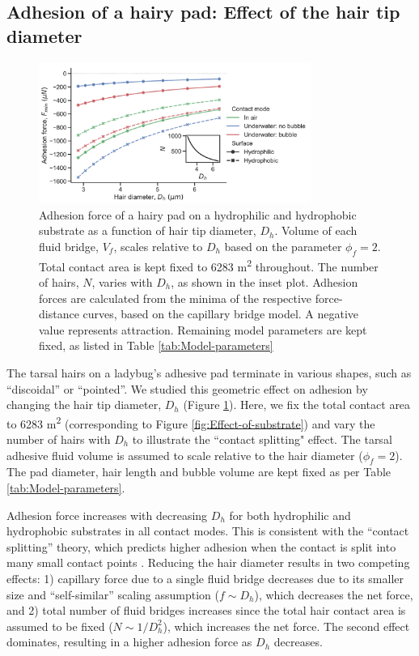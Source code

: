 \documentclass[vruler,JEB]{COB}%
\begin{document}
\subsection{Adhesion of a hairy pad: Effect of the hair tip diameter}

\begin{figure}
\includegraphics[width=3.5in]{Figure6-Model_effect_of_hair_size}
\caption{\label{fig:Effect-of-hair}Adhesion force of a hairy pad on a hydrophilic and hydrophobic substrate as a function of
hair tip diameter, $D_{h}$. Volume of each fluid bridge, $V_{f}$, scales
relative to $D_{h}$ based on the parameter $\phi_{f}=2$. Total contact area is kept fixed to 6283 \textmu m\textsuperscript{2} throughout.  The number of hairs, $N$, varies with $D_h$, as shown in the inset plot.  Adhesion
forces are calculated from the minima of the respective force-distance
curves, based on the capillary bridge model. A negative value represents
attraction. Remaining model parameters are kept fixed, as listed in Table \ref{tab:Model-parameters}}
\end{figure}

The tarsal hairs on a ladybug's adhesive pad terminate in various shapes, such as ``discoidal''
or ``pointed''. We studied this geometric effect on adhesion by
changing the hair tip diameter, $D_{h}$ (Figure \ref{fig:Effect-of-hair}).
Here, we fix the total contact area to 6283 \textmu m\textsuperscript{2} (corresponding to Figure \ref{fig:Effect-of-substrate}) and vary the number of hairs with $D_h$ to illustrate the ``contact splitting" effect. The tarsal adhesive fluid volume is assumed to scale relative
to the hair diameter ($\phi_{f}=2$). The pad diameter, hair length and bubble volume
are kept fixed as per Table \ref{tab:Model-parameters}.

Adhesion force increases with decreasing $D_{h}$ for both hydrophilic
and hydrophobic substrates in all contact modes. This is consistent
with the ``contact splitting'' theory, which predicts higher adhesion
when the contact is split into many small contact points \citep{RN24}.
Reducing the hair diameter results in two competing effects: 1) capillary
force due to a single fluid bridge decreases due to its smaller size
and ``self-similar'' scaling assumption ($f\sim D_{h}$), which
decreases the net force, and 2) total number of fluid bridges increases
since the total hair contact area is assumed to be fixed ($N\sim1/D_{h}^{2}$),
which increases the net force. The second effect dominates, resulting
in a higher adhesion force as $D_{h}$ decreases. 
\end{document}
